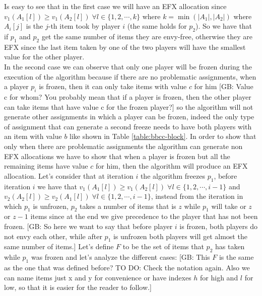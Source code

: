 \documentclass{article}
\newcommand{\gb}[1]{{\color{red}[GB: #1]}}
\begin{document}
Is easy to see that in the first case we will have an EFX allocation since $v_1(A_1[l])\ge v_1(A_2[l])\; \forall l \in \{1,2,\cdots,k\}$ where $k = \min (|A_1|, |A_2|)$ where $A_i[j]$ is the $j$-th item took by player $i$ (the same holds for $p_2$).
So we have that if $p_1$ and $p_2$ get the same number of items they are envy-free, otherwise they are EFX since the last item taken by one of the two players will have the smallest value for the other player.\\
 In the second case we can observe that only one player will be frozen during the execution of the algorithm because if there are no problematic assignments, when a player $p_i$ is frozen, then it can only take items with value $c$ for him
\gb{Value c for whom? You probably mean that if a player is frozen, then the other player can take items that have value c for the frozen player?}
so the algorithm will not generate other assignments in which a player can be frozen, indeed the only type of assignment that can generate a second freeze needs to have both players with an item with value $b$ like shown in Table \ref{table:bbcc-block}. In order to show that only when there are problematic assignments the algorithm can generate non EFX allocations we have to show that when a player is frozen but all the remaining items have value $c$ for him, then the algorithm will produce an EFX allocation.
Let's consider that at iteration $i$ the algorithm freezes $p_1$, before iteration $i$ we have that $v_1(A_1[l])\ge v_1(A_2[l]) \; \forall l \in \{1,2,\cdots, i-1\}$ and $v_2(A_2[l]) \ge v_2(A_1[l])\;\forall l \in \{1,2,\cdots,i-1\}$,  instead from the iteration in which $p_1$ is unfrozen, $p_2$ takes a number of items that is $z$ while $p_1$ will take or $z$ or $z-1$ items since at the end we give precedence to the player that has not been frozen.
\gb{So here we want to say that before player $i$ is frozen, both players do not envy each other, while after $p_1$ is unfrozen both players will get almost the same number of items.}
Let's define $F$ to be the set of items that $p_2$ has taken while $p_1$ was frozen and let's analyze the different cases:
\gb{This $F$ is the same as the one that was defined before? TO DO: Check the notation again. Also we can name items just x and y for convenience or have indexes $h$ for high and $l$ for low, so that it is easier for the reader to follow.}
\end{document}
